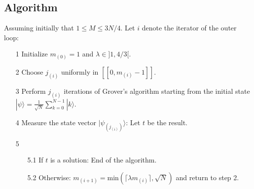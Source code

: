 \subsection{Algorithm}
\begin{algorithm}[H]
Assuming initially that $1 \leq M \leq 3N/4$. Let $i$ denote the iterator of the outer loop:
\begin{itemize}
	\item[1] Initialize $m_{(0)}=1$ and $\lambda \in ]1, 4/3[$.
	\item[2] Choose $j_{(i)}$ uniformly in $[\![0, m_{(i)}-1]\!]$.
	\item[3] Perform $j_{(i)}$ iterations of Grover's algorithm starting from the initial state $| \psi \rangle = \frac{1}{\sqrt{N}} \sum_{k=0}^{N-1} |k\rangle$.
	\item[4] Measure the state vector $| \psi_{(j_{(i)})} \rangle$: Let $t$ be the result.
	\item[5]
	\begin{itemize}
    	\item[5.1] If $t$ is a solution: End of the algorithm.
    	\item[5.2] Otherwise: $m_{(i+1)} = \mathrm{min}(\lceil \lambda m_{(i)} \rceil, \sqrt{N})$ and return to step 2.
	\end{itemize}
\end{itemize}
\end{algorithm}

